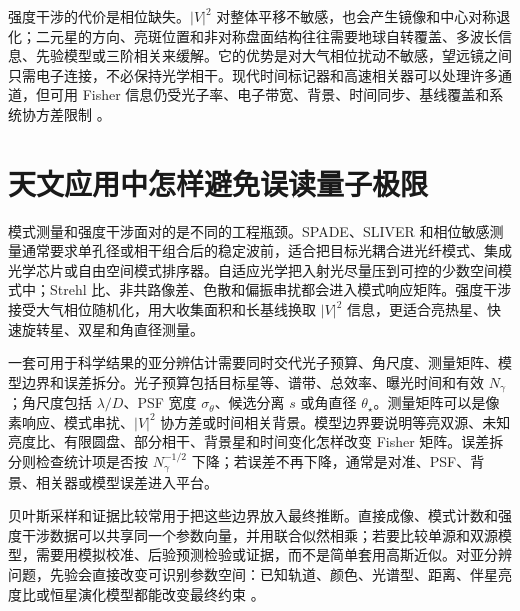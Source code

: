 强度干涉的代价是相位缺失。\(|V|^2\) 对整体平移不敏感，也会产生镜像和中心对称退化；二元星的方向、亮斑位置和非对称盘面结构往往需要地球自转覆盖、多波长信息、先验模型或三阶相关来缓解。它的优势是对大气相位扰动不敏感，望远镜之间只需电子连接，不必保持光学相干。现代时间标记器和高速相关器可以处理许多通道，但可用 Fisher 信息仍受光子率、电子带宽、背景、时间同步、基线覆盖和系统协方差限制 \citep{2017MNRAS.472.4126G,2020RScI...91a3108W,2020NatAs...4.1164A,2024MNRAS.529.4387A}。

\section{天文应用中怎样避免误读量子极限}

模式测量和强度干涉面对的是不同的工程瓶颈。SPADE、SLIVER 和相位敏感测量通常要求单孔径或相干组合后的稳定波前，适合把目标光耦合进光纤模式、集成光学芯片或自由空间模式排序器。自适应光学把入射光尽量压到可控的少数空间模式中；Strehl 比、非共路像差、色散和偏振串扰都会进入模式响应矩阵。强度干涉接受大气相位随机化，用大收集面积和长基线换取 \(|V|^2\) 信息，更适合亮热星、快速旋转星、双星和角直径测量。

一套可用于科学结果的亚分辨估计需要同时交代光子预算、角尺度、测量矩阵、模型边界和误差拆分。光子预算包括目标星等、谱带、总效率、曝光时间和有效 \(N_\gamma\)；角尺度包括 \(\lambda/D\)、PSF 宽度 \(\sigma_\theta\)、候选分离 \(s\) 或角直径 \(\theta_\star\)。测量矩阵可以是像素响应、模式串扰、\(|V|^2\) 协方差或时间相关背景。模型边界要说明等亮双源、未知亮度比、有限圆盘、部分相干、背景星和时间变化怎样改变 Fisher 矩阵。误差拆分则检查统计项是否按 \(N_\gamma^{-1/2}\) 下降；若误差不再下降，通常是对准、PSF、背景、相关器或模型误差进入平台。

贝叶斯采样和证据比较常用于把这些边界放入最终推断。直接成像、模式计数和强度干涉数据可以共享同一个参数向量，并用联合似然相乘；若要比较单源和双源模型，需要用模拟校准、后验预测检验或证据，而不是简单套用高斯近似。对亚分辨问题，先验会直接改变可识别参数空间：已知轨道、颜色、光谱型、距离、伴星亮度比或恒星演化模型都能改变最终约束 \citep{2009MNRAS.398.1601F,2013PASP..125..306F}。


